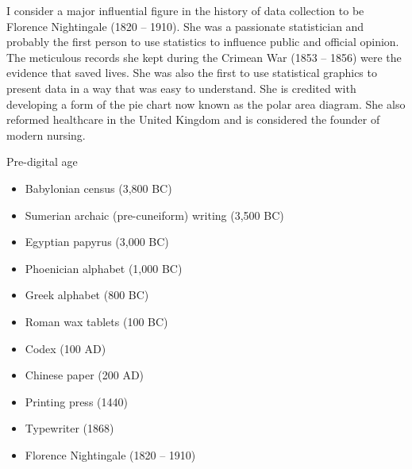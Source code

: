 I consider a major influential figure in the history of data
collection to be Florence Nightingale (1820 -- 1910).  She was a passionate statistician
and probably the first person to use statistics to influence public and official
opinion.  The meticulous records she kept during the Crimean War
(1853 -- 1856) were the evidence that saved lives.  She was also the first to use
statistical graphics to present data in a way that was easy to understand.  She is
credited with developing a form of the pie chart now known as the polar area
diagram.  She also reformed healthcare in the United Kingdom and
is considered the founder of modern nursing.

\begin{slidebox}{Pre-digital age}{}
  \begin{itemize}
    \item Babylonian census (3,800 BC)
    \item Sumerian archaic (pre-cuneiform) writing (3,500 BC)
    \item Egyptian papyrus (3,000 BC)
    \item Phoenician alphabet (1,000 BC)
    \item Greek alphabet (800 BC)
    \item Roman wax tablets (100 BC)
    \item Codex (100 AD)
    \item Chinese paper (200 AD)
    \item Printing press (1440)
    \item Typewriter (1868)
    \item Florence Nightingale (1820 -- 1910)
  \end{itemize}
\end{slidebox}

